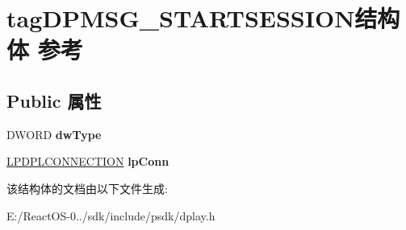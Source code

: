 \hypertarget{structtag_d_p_m_s_g___s_t_a_r_t_s_e_s_s_i_o_n}{}\section{tag\+D\+P\+M\+S\+G\+\_\+\+S\+T\+A\+R\+T\+S\+E\+S\+S\+I\+O\+N结构体 参考}
\label{structtag_d_p_m_s_g___s_t_a_r_t_s_e_s_s_i_o_n}
\subsection*{Public 属性}
\begin{DoxyCompactItemize}
\item 
\mbox{\label{structtag_d_p_m_s_g___s_t_a_r_t_s_e_s_s_i_o_n_adcaf0fe6185204c421e513058f026425}} 
D\+W\+O\+RD {\bfseries dw\+Type}
\item 
\mbox{\label{structtag_d_p_m_s_g___s_t_a_r_t_s_e_s_s_i_o_n_accee7387dde2a385f521db1feee4dece}} 
\hyperlink{structtag_d_p_l_c_o_n_n_e_c_t_i_o_n}{L\+P\+D\+P\+L\+C\+O\+N\+N\+E\+C\+T\+I\+ON} {\bfseries lp\+Conn}
\end{DoxyCompactItemize}


该结构体的文档由以下文件生成\+:\begin{DoxyCompactItemize}
\item 
E\+:/\+React\+O\+S-\/0../sdk/include/psdk/dplay.\+h\end{DoxyCompactItemize}
